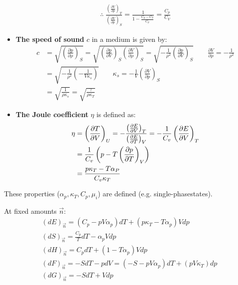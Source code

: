 \begin{defn}
\begin{itemize}
\begin{tui}
\begin{gather*}
\therefore \; \frac{\left( \frac{\partial V}{\partial p} \right)_T}
{\left( \frac{\partial V}{\partial p} \right)_S}
=\frac{1}{1-\frac{C_p-C_V}{C_p}}=\frac{C_p}{C_V}
\end{gather*}
\end{tui}
\item 
\textbf{The speed of sound} \(c\) in a medium is given by:
\begin{align*}
    c &= \sqrt{\left( \frac{\partial p}{\partial \rho} \right)_S} 
    = \sqrt{\left( \frac{\partial p}{\partial V} \right)_S \left( \frac{\partial V}{\partial \rho} \right)_S} 
    = \sqrt{-\frac{1}{\rho^2} \left( \frac{\partial p}{\partial V} \right)_S}
    \qquad \frac{\partial V}{\partial \rho} = -\frac{1}{\rho^2} \\
    &= \sqrt{-\frac{1}{\rho^2} \left( -\frac{1}{V \kappa_s} \right)} 
    \qquad \kappa_s = -\frac{1}{V} \left( \frac{\partial V}{\partial p} \right)_S \\
    &= \sqrt{\frac{1}{\rho \kappa_s}} =\sqrt{\frac{\gamma}{\rho \kappa_T}}
\end{align*}
\item
\textbf{The Joule coefficient} \(\eta\) is defined as:
\begin{align*}
\eta &= \left( \frac{\partial T}{\partial V} \right)_U 
=-\frac{\left(\frac{\partial E}{\partial V}\right)_T}{\left(\frac{\partial E}{\partial T}\right)_V}
= -\frac{1}{C_v} \left( \frac{\partial E}{\partial V} \right)_T \\
&= \frac{1}{C_v} \left( p - T \left( \frac{\partial p}{\partial T} \right)_V \right) \\
&= \frac{p\kappa_T - T\alpha_P}{C_v\kappa_T}
\end{align*}
\end{itemize}
\end{defn}
\begin{example}
    \begin{yzh}
        These properties (\(\alpha_p,\kappa_T,C_p,\mu_i\)) are defined
        (e.g. single-phasestates).
    \end{yzh}
    At fixed amounts \(\vec{n}\):
    \begin{gather*}
        (dE)_{\vec{n}}= (C_p -pV\alpha_p) dT + (p\kappa_T -T \alpha_p)V  dp
        \\(dS)_{\vec{n}}= \frac{C_p}{T} dT -\alpha_p V dp
        \\(dH)_{\vec{n}}= C_p  dT+(1-T \alpha_p)V dp\\
        (dF)_{\vec{n}} = -S dT - p dV 
        =( -S - p V \alpha_p ) dT + ( p V \kappa_T ) dp\\
        (dG)_{\vec{n}} = -S dT + V dp
    \end{gather*}
\end{example}
